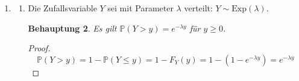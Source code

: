 \documentclass[a4paper]{scrartcl}
\newtheorem*{behaupt}{Behauptung}
\newcommand{\dif}{\ \mathrm{d}}
\newcommand{\prob}{\mathbb{P}}
\newcommand{\e}{\mathbb{E}}
\def \blattnr {4}
\begin{document}
\begin{enumerate}[label=\bfseries \blattnr.\arabic*]
\begin{enumerate}
            \item
                Sei $Z$ eine Zufallsvariable mit der Verteilungsfunktion
                $F_Z \colon \mathbb{R} \to [0,1]$:
                \begin{equation*}
                    F_Z(z) =
                    \begin{cases}
                        1 - \alpha e^{-\lambda z} , & z \geq 0 \\
                        0 , & z < 0 \\
                    \end{cases}
                    \text{ für }
                    \alpha \in [0,1]
                \end{equation*}
                \begin{behaupt}
                    \begin{equation*}
                        \e[Z] = \frac{\alpha}{\lambda}
                    \end{equation*}
                \end{behaupt}
                \begin{proof}
                    \begin{equation*}
                        \begin{split}
                            \e[Z]
                            &= \int_0^\infty 1 - F_Z(z) \dif z \\
                            &= \int_0^\infty \alpha e^{-\lambda z} \dif z \\
                            &= \alpha \int_0^\infty e^{-\lambda z} \dif z \\
                            &= \alpha \cdot \frac{1}{\lambda}
                             = \frac{\alpha}{\lambda}
                        \end{split}
                    \end{equation*}
                \end{proof}

        \end{enumerate}

    \item 
        \begin{enumerate}
            \item
                Die Zufallsvariable $Y$ sei mit Parameter $\lambda$ verteilt:
                $Y \sim \text{Exp}(\lambda)$.
                \begin{behaupt}
                    Es gilt $\prob(Y > y) = e^{-\lambda y}$ für $y \geq 0$.
                \end{behaupt}
                \begin{proof}
                    \begin{equation*}
                        \prob(Y > y)
                        = 1 - \prob(Y \leq y)
                        = 1 - F_Y(y)
                        = 1 - (1 - e^{-\lambda y})
                        = e^{-\lambda y}
                    \end{equation*}
                \end{proof}


\end{enumerate}
\end{enumerate}
\end{document}
